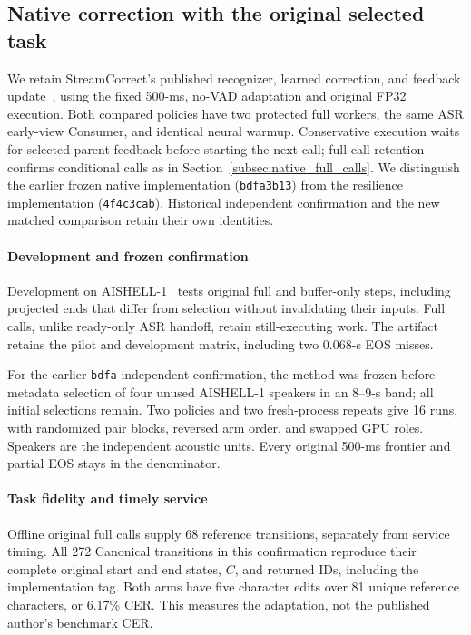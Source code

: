 \subsection{Native correction with the original selected task}
\label{subsec:native_retention_eval}
We retain StreamCorrect's published recognizer, learned correction, and
feedback update~\cite{vu2026streamcorrect}, using the fixed 500-ms, no-VAD
adaptation and original FP32 execution. Both compared policies have two
protected full workers, the same ASR early-view Consumer, and identical
neural warmup. Conservative execution waits for selected parent feedback
before starting the next call; full-call retention confirms conditional
calls as in Section~\ref{subsec:native_full_calls}.
We distinguish the earlier frozen native implementation (\texttt{bdfa3b13})
from the resilience implementation (\texttt{4f4c3cab}). Historical independent
confirmation and the new matched comparison retain their own identities.

\paragraph{Development and frozen confirmation}
Development on AISHELL-1~\cite{bu2017aishell} tests original full and
buffer-only steps, including projected ends that differ from selection
without invalidating their inputs. Full calls, unlike ready-only ASR
handoff, retain still-executing work. The artifact retains the pilot and
development matrix, including two 0.068-s EOS misses.

For the earlier \texttt{bdfa} independent confirmation, the method was
frozen before metadata selection of four unused AISHELL-1 speakers in
an 8--9-s band; all initial selections remain. Two policies
and two fresh-process repeats give 16 runs, with randomized pair blocks,
reversed arm order, and swapped GPU roles. Speakers are the independent
acoustic units. Every original 500-ms frontier and partial EOS stays in
the denominator.

\paragraph{Task fidelity and timely service}
Offline original full calls supply 68 reference transitions, separately
from service timing. All 272 Canonical transitions in this confirmation reproduce
their complete original start and end states, $C$, and returned IDs,
including the implementation tag. Both arms have five character edits
over 81 unique reference characters, or 6.17\% CER. This measures the
adaptation, not the published author's benchmark CER.

